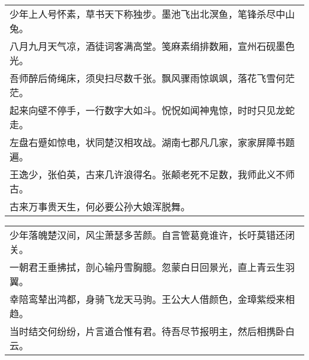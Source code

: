 \nopagebreak%
\nopagebreak%
\noindent\begin{minipage}{\linewidth}
  \vskip-3pt\begin{table}[H]
    \centering
    \begin{tabular}{@{}l@{}}
少年上人号怀素，草书天下称独步。墨池飞出北溟鱼，笔锋杀尽中山兔。\\
八月九月天气凉，酒徒词客满高堂。笺麻素绢排数厢，宣州石砚墨色光。\\
吾师醉后倚绳床，须臾扫尽数千张。飘风骤雨惊飒飒，落花飞雪何茫茫。\\
起来向壁不停手，一行数字大如斗。怳怳如闻神鬼惊，时时只见龙蛇走。\\
左盘右蹙如惊电，状同楚汉相攻战。湖南七郡凡几家，家家屏障书题遍。\\
王逸少，张伯英，古来几许浪得名。张颠老死不足数，我师此义不师古。\\
古来万事贵天生，何必要公孙大娘浑脱舞。
    \end{tabular}
  \end{table}
\end{minipage}
\vspace{1cm}


\nopagebreak%
\nopagebreak%
\noindent\begin{minipage}{\linewidth}
  \vskip-3pt\begin{table}[H]
    \centering
    \begin{tabular}{@{}l@{}}
少年落魄楚汉间，风尘萧瑟多苦颜。自言管葛竟谁许，长吁莫错还闭关。\\
一朝君王垂拂拭，剖心输丹雪胸臆。忽蒙白日回景光，直上青云生羽翼。\\
幸陪鸾辇出鸿都，身骑飞龙天马驹。王公大人借颜色，金璋紫绶来相趋。\\
当时结交何纷纷，片言道合惟有君。待吾尽节报明主，然后相携卧白云。
    \end{tabular}
  \end{table}
\end{minipage}
\vspace{1cm}


